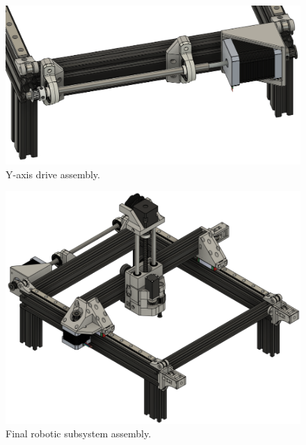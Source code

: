\begin{figure}[H]
	\centering
	\includegraphics[width=0.7\linewidth]{figures/202108/y-axis-drive-assembly.png}
	\caption{Y-axis drive assembly.}
	\label{fig:y-axis-drive-assembly}
\end{figure}

\begin{figure}[H]
	\centering
	\includegraphics[width=0.9\linewidth]{figures/202108/final-assembly.png}
	\caption{Final robotic subsystem assembly.}
	\label{fig:final-assembly}
\end{figure}

\pendsign